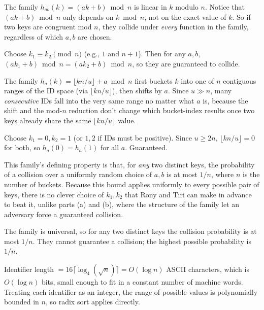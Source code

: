 \documentclass[12pt,twoside]{article}
\begin{document}
\begin{problems}
\problem %
\begin{problemparts}
 
\problempart %
The family $h_{ab}(k) = (ak+b)\bmod n$ is linear in $k$ modulo $n$. Notice that $(ak+b) \bmod n$ only depends on $k \bmod n$, not on the exact value of $k$. So if two keys are congruent mod $n$, they collide under \emph{every} function in the family, regardless of which $a,b$ are chosen.
 
Choose $k_1 \equiv k_2 \pmod n$ (e.g., $1$ and $n+1$). Then for any $a,b$, $(ak_1+b)\bmod n = (ak_2+b)\bmod n$, so they are guaranteed to collide.
 
\problempart %
The family $h_a(k) = \lfloor kn/u \rfloor + a \bmod n$ first buckets $k$ into one of $n$ contiguous ranges of the ID space (via $\lfloor kn/u\rfloor$), then shifts by $a$. Since $u \gg n$, many \emph{consecutive} IDs fall into the very same range no matter what $a$ is, because the shift and the mod-$n$ reduction don't change which bucket-index results once two keys already share the same $\lfloor kn/u \rfloor$ value.
 
Choose $k_1=0, k_2=1$ (or $1,2$ if IDs must be positive). Since $u\ge 2n$, $\lfloor kn/u\rfloor=0$ for both, so $h_a(0)=h_a(1)$ for all $a$. Guaranteed.
 
\problempart %
This family's defining property is that, for \emph{any} two distinct keys, the probability of a collision over a uniformly random choice of $a,b$ is at most $1/n$, where $n$ is the number of buckets. Because this bound applies uniformly to every possible pair of keys, there is no clever choice of $k_1,k_2$ that Rony and Tiri can make in advance to beat it, unlike parts (a) and (b), where the structure of the family let an adversary force a guaranteed collision.
 
The family is universal, so for any two distinct keys the collision probability is at most $1/n$. They cannot guarantee a collision; the highest possible probability is $1/n$.
 
\end{problemparts}

\problem %

\begin{problemparts}
\problempart %
Identifier length $=16\lceil \log_4(\sqrt n)\rceil = O(\log n)$ ASCII characters, which is $O(\log n)$ bits, small enough to fit in a constant number of machine words. Treating each identifier as an integer, the range of possible values is polynomially bounded in $n$, so radix sort applies directly.
 

\end{problemparts}
\end{problems}
\end{document}
